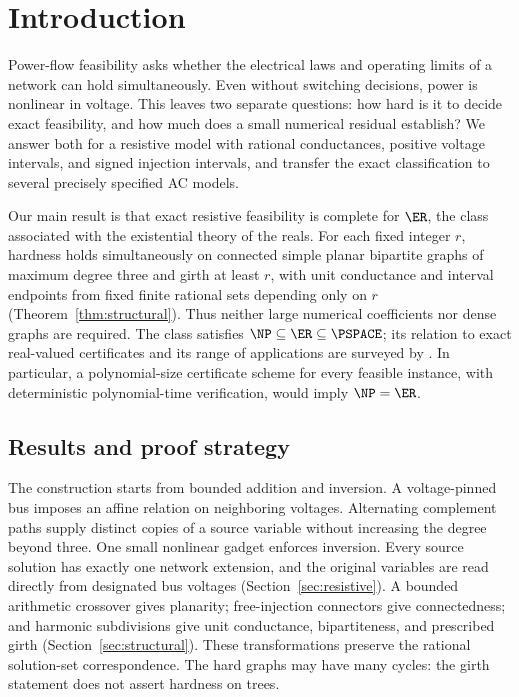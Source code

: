 \section{Introduction}
\label{sec:introduction}

Power-flow feasibility asks whether the electrical laws and operating limits
of a network can hold simultaneously. Even without switching decisions,
power is nonlinear in voltage. This leaves two separate questions: how hard
is it to decide exact feasibility, and how much does a small numerical
residual establish? We answer both for a resistive model with rational
conductances, positive voltage intervals, and signed injection intervals,
and transfer the exact classification to several precisely specified AC
models.

Our main result is that exact resistive feasibility is complete for
$\ER$, the class associated with the existential theory of the reals.
For each fixed integer $r$, hardness holds simultaneously on connected
simple planar bipartite graphs of maximum degree three and girth at least
$r$, with unit conductance and interval endpoints from fixed finite rational
sets depending only on $r$ (Theorem~\ref{thm:structural}). Thus neither
large numerical coefficients nor dense graphs are required. The class
satisfies $\NP\subseteq\ER\subseteq\PSPACE$; its relation to exact
real-valued certificates and its range of applications are surveyed by
\citet{SchaeferEtAl2024}. In particular, a polynomial-size certificate scheme
for every feasible instance, with deterministic polynomial-time verification,
would imply $\NP=\ER$.

\subsection{Results and proof strategy}

The construction starts from bounded addition and inversion. A voltage-pinned
bus imposes an affine relation on neighboring voltages. Alternating complement
paths supply distinct copies of a source variable without increasing the
degree beyond three. One small nonlinear gadget enforces inversion. Every
source solution has exactly one network extension, and the original variables
are read directly from designated bus voltages
(Section~\ref{sec:resistive}). A bounded arithmetic crossover gives planarity;
free-injection connectors give connectedness; and harmonic subdivisions give
unit conductance, bipartiteness, and prescribed girth
(Section~\ref{sec:structural}). These transformations preserve the rational
solution-set correspondence. The hard graphs may have many cycles: the girth
statement does not assert hardness on trees.

